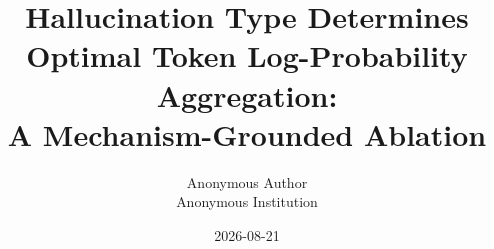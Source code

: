 \documentclass[11pt,twocolumn]{article}
\title{Hallucination Type Determines Optimal Token Log-Probability Aggregation:\\A Mechanism-Grounded Ablation}
\author{Anonymous Author\\Anonymous Institution}
\date{2026-08-21}
\begin{document}
\maketitle

\begin{abstract}

\end{abstract}












\appendix

\end{document}

